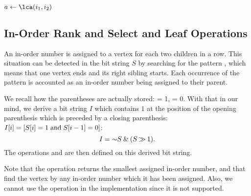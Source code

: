 \begin{algorithm}
\begin{algorithmic}
	\State $a \gets \lca(i_1, i_2)$
	\State {}
\EndFunction
\end{algorithmic}
\end{algorithm}

\begin{algorithm}
\begin{algorithmic}
	\State {}
\EndFunction
\end{algorithmic}
\end{algorithm}

\begin{algorithm}
\begin{algorithmic}
	\State {}
\EndFunction
\end{algorithmic}
\end{algorithm}

\subsection{In-Order Rank and Select and Leaf Operations}

An in-order number is assigned to a vertex for each two children in a row.
This situation can be detected in the bit string $S$ by searching for the pattern \str{)(}, which means that one vertex ends and its right sibling starts.
Each occurrence of the pattern is accounted as an in-order number being assigned to their parent.

We recall how the parentheses are actually stored: \openingParen = 1, \closingParen = 0.
With that in our mind, we derive a bit string $I$ which contains $1$ at the position of the opening parenthesis which is preceded by a closing parenthesis: $I[i] = [S[i] = 1\allowbreak \mathrel{\textrm{and}} S[i-1] = 0]$:
$$ I = \mathord{\sim} S \mathbin{\&} (S \mathbin{\gg} 1). $$
The operations \inRank{} and \inSelect{} are then defined on this derived bit string.

Note that the operation \inRank{} returns the smallest assigned in-order number, and that \inSelect{} find the vertex by any in-order number which it has been assigned.
Also, we cannot use the operation \degree{} in the implementation since it is not supported.

\begin{algorithm}
\begin{algorithmic}
		\State {}
	\Else
		\State {}
	\EndIf
\EndFunction
\end{algorithmic}
\end{algorithm}

